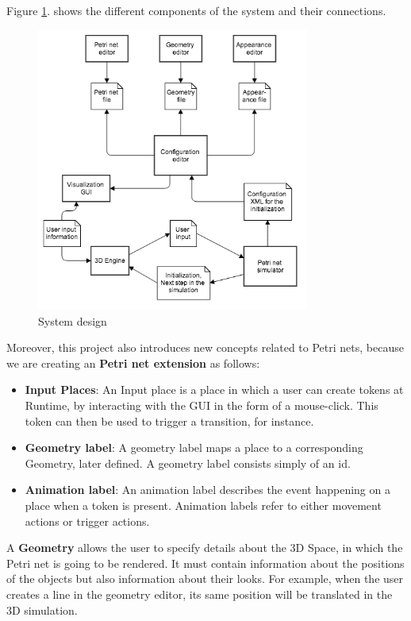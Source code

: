 Figure \ref{fig:system_diagram}. shows the different components of the system and their connections.

\begin{figure}[htp]
\begin{center}
  \includegraphics[width=0.8\textwidth]{image/system_design.png}
  \caption{System design}
  \label{fig:system_diagram}
\end{center}
\end{figure}

Moreover, this project also introduces new concepts related to Petri nets, because we are creating an \textbf{Petri net extension} as follows:
\begin{itemize}
  \item \textbf{Input Places}: An Input place is a place in which a user can create tokens at Runtime, by interacting with the GUI in the form of a mouse-click. This token can then be used to trigger a transition, for instance.
  \item \textbf{Geometry label}: A geometry label maps a place to a corresponding Geometry, later defined.
  A geometry label consists simply of an id.

  \item \textbf{Animation label}: An animation label describes the event happening on a place when a token is present.
Animation labels refer to either movement actions or trigger actions.
\end{itemize}

A \textbf{Geometry} allows the user to specify details about the 3D Space, in which the Petri net is going to be rendered. It must contain information about the positions of the objects but also information about their looks. For example, when the user creates a line in the geometry editor, its same position will be translated in the 3D simulation.

